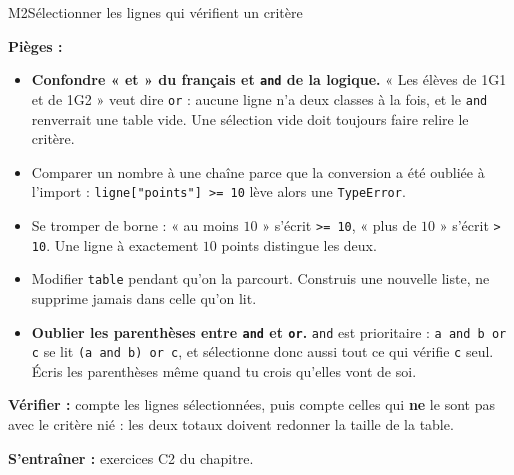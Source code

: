 \begin{fichemethode}{M2}{Sélectionner les lignes qui vérifient un critère}

\textbf{Pièges :}
\begin{itemize}
  \item \textbf{Confondre « et » du français et \lstinline{and} de la logique.} « Les élèves
    de 1G1 et de 1G2 » veut dire \lstinline{or} : aucune ligne n'a deux classes à la fois,
    et le \lstinline{and} renverrait une table vide. Une sélection vide doit toujours faire
    relire le critère.
  \item Comparer un nombre à une chaîne parce que la conversion a été oubliée à l'import :
    \lstinline{ligne["points"] >= 10} lève alors une \lstinline{TypeError}.
  \item Se tromper de borne : « au moins $10$ » s'écrit \lstinline{>= 10}, « plus de $10$ »
    s'écrit \lstinline{> 10}. Une ligne à exactement $10$ points distingue les deux.
  \item Modifier \lstinline{table} pendant qu'on la parcourt. Construis une nouvelle liste,
    ne supprime jamais dans celle qu'on lit.
  \item \textbf{Oublier les parenthèses entre \lstinline{and} et \lstinline{or}.}
    \lstinline{and} est prioritaire : \lstinline{a and b or c} se lit
    \lstinline{(a and b) or c}, et sélectionne donc aussi tout ce qui vérifie \lstinline{c}
    seul. Écris les parenthèses même quand tu crois qu'elles vont de soi.
\end{itemize}

\textbf{Vérifier :} compte les lignes sélectionnées, puis compte celles qui \textbf{ne} le
sont pas avec le critère nié : les deux totaux doivent redonner la taille de la table.

\textbf{S'entraîner :} exercices C2 du chapitre.
\end{fichemethode}
